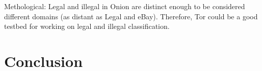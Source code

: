 \documentclass[11pt,a4paper,table]{article}
\begin{document}
Methological: Legal and illegal in Onion are distinct enough to be considered different domains (as distant as Legal and eBay). 
Therefore, Tor could be a good testbed for working on legal and illegal classification.


\section{Conclusion}
 














\end{document}
